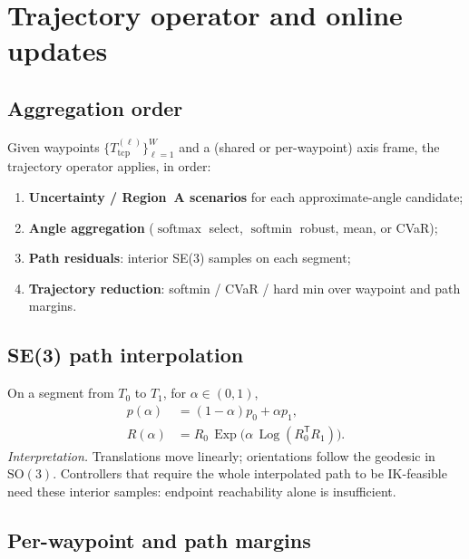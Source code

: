 \documentclass[11pt,a4paper]{article}
\newcommand{\SO}{\mathrm{SO}}
\newcommand{\Tcp}{T_{\mathrm{tcp}}}
\newcommand{\softmin}{\operatorname{softmin}}
\newcommand{\softmax}{\operatorname{softmax}}
\begin{document}
\section{Trajectory operator and online updates}
\label{sec:traj}

\subsection{Aggregation order}
\label{sec:agg-order}

Given waypoints \(\{\Tcp^{(\ell)}\}_{\ell=1}^{W}\) and a (shared or
per-waypoint) axis frame, the trajectory operator applies, in order:
\begin{enumerate}[leftmargin=1.6em]
  \item \textbf{Uncertainty / Region~A scenarios} for each approximate-angle
        candidate;
  \item \textbf{Angle aggregation} (\(\softmax\) select, \(\softmin\) robust,
        mean, or CVaR);
  \item \textbf{Path residuals}: interior SE(3) samples on each segment;
  \item \textbf{Trajectory reduction}: softmin / CVaR / hard min over
        waypoint and path margins.
\end{enumerate}

\subsection{SE(3) path interpolation}
\label{sec:se3-interp}

On a segment from \(T_{0}\) to \(T_{1}\), for \(\alpha\in(0,1)\),
\begin{equation}
\label{eq:se3-interp}
\begin{aligned}
  p(\alpha)
  &=
  (1-\alpha)p_{0}+\alpha p_{1},
  \\
  R(\alpha)
  &=
  R_{0}\,
  \operatorname{Exp}\bigl(
    \alpha\,\operatorname{Log}(R_{0}^{\mathsf T}R_{1})
  \bigr).
\end{aligned}
\end{equation}
\emph{Interpretation.}
Translations move linearly; orientations follow the geodesic in \(\SO(3)\).
Controllers that require the whole interpolated path to be IK-feasible need
these interior samples: endpoint reachability alone is insufficient.

\subsection{Per-waypoint and path margins}
\label{sec:path-margin}
\end{document}
